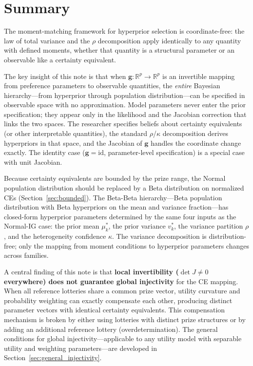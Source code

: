 \documentclass[11pt,a4paper]{article}
\theoremstyle{definition}
\begin{document}
\section{Summary}

The moment-matching framework for hyperprior selection is
coordinate-free: the law of total variance and the $\rho$ decomposition apply
identically to any quantity with defined moments, whether that quantity is a
structural parameter or an observable like a certainty equivalent.

The key insight of this note is that when $\mathbf{g}: \mathbb{R}^p \to
\mathbb{R}^p$ is an invertible mapping from preference parameters to observable
quantities, the \emph{entire} Bayesian hierarchy---from hyperprior through
population distribution---can be specified in observable space with no
approximation. Model parameters never enter the prior specification; they
appear only in the likelihood and the Jacobian correction that links the two
spaces. The researcher specifies beliefs about certainty equivalents
(or other interpretable quantities), the standard $\rho$/$\kappa$
decomposition derives hyperpriors in that space, and the Jacobian of
$\mathbf{g}$ handles the coordinate change exactly. The identity case
($\mathbf{g} = \text{id}$, parameter-level specification) is a special case
with unit Jacobian.

Because certainty equivalents are bounded by the prize range, the
Normal population distribution should be replaced by a Beta distribution on
normalized CEs (Section~\ref{sec:bounded}). The Beta-Beta hierarchy---Beta
population distribution with Beta hyperpriors on the mean and variance
fraction---has closed-form hyperprior parameters determined by the same four
inputs as the Normal-IG case: the prior mean $\mu_k^*$, the prior variance
$v_k^*$, the variance partition $\rho$, and the heterogeneity confidence
$\kappa$. The variance decomposition is distribution-free; only the mapping
from moment conditions to hyperprior parameters changes across families.

A central finding of this note is that \textbf{local invertibility ($\det J
\neq 0$ everywhere) does not guarantee global injectivity} for the CE mapping.
When all reference lotteries share a common prize vector, utility curvature and
probability weighting can exactly compensate each other, producing distinct
parameter vectors with identical certainty equivalents. This compensation
mechanism is broken by either using lotteries with distinct prize structures or
by adding an additional reference lottery (overdetermination). The general
conditions for global injectivity---applicable to any utility model with
separable utility and weighting parameters---are developed in
Section~\ref{sec:general_injectivity}.
\end{document}
